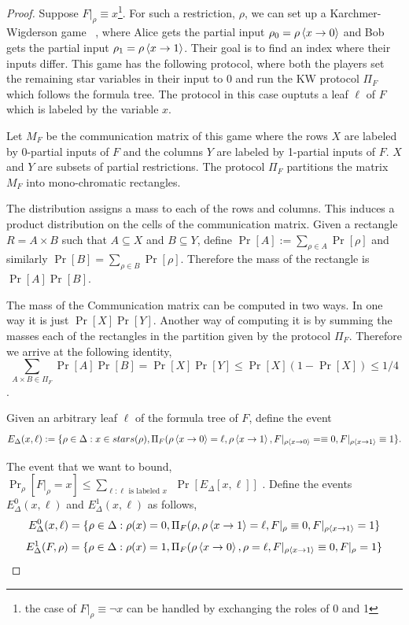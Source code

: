 \begin{proof}
    Suppose $F|_\rho \equiv x$\footnote{the case of $F|_\rho \equiv \neg x$ can be handled by exchanging the roles of 0 and 1}. For such a restriction, $\rho$, we can set up a Karchmer-Wigderson game ~\cite{karchmer1990monotone}, where Alice gets the partial input $\rho_0 = \rho \left\langle x \to 0 \right\rangle$ and Bob gets the partial input $\rho_1 = \rho \left\langle x \to 1 \right\rangle$. Their goal is to find an index where their inputs differ. This game has the following protocol,
    where both the players set the remaining star variables in their input to 0 and run the KW protocol $\Pi_F$ which follows the formula tree. The protocol in this case ouptuts a leaf $\ell$ of $F$ which is labeled by the variable $x$.   

    Let $M_F$ be the communication matrix of this game where the rows $X$ are labeled by 0-partial inputs of $F$ and the columns $Y$ are labeled by 1-partial inputs of $F$. $X$ and $Y$ are subsets of partial restrictions. The protocol $\Pi_F$ partitions the matrix $M_F$ into mono-chromatic rectangles. 

    The distribution assigns a mass to each of the rows and columns. This induces a product distribution on the cells of the communication matrix. 
    Given a rectangle $R = A \times B$ such that $A \subseteq X$ and $B \subseteq Y$, define $\Pr[A] := \sum_{\rho \in A} \Pr[\rho]$ and similarly $\Pr[B] = \sum_{\rho \in B} \Pr[\rho]$. Therefore the mass of the rectangle is $\Pr[A]\Pr[B]$. 

    The mass of the Communication matrix can be computed in two ways. In one way it is just $\Pr[X]\Pr[Y]$. 
    Another way of computing it is by summing the masses each of the rectangles in the partition given by the protocol $\Pi_F$. Therefore we arrive at the following identity,
    $$\sum_{A \times B \in \Pi_F} \Pr[A] \Pr [B] = \Pr[X] \Pr[Y] \leq \Pr[X](1- \Pr[X]) \leq 1/4$$.

    Given an arbitrary leaf $\ell$ of the formula tree of $F$, define the event 
    $$E_\Delta(x,\ell):= \{\rho \in \Delta: x \in stars(\rho), \Pi_F(\rho\left\langle x \to 0 \right\rangle = \ell,\rho\left\langle x \to 1 \right\rangle, F|_{\rho\left\langle x \to 0 \right\rangle}=\equiv  0, F|_{\rho\left\langle x \to 1 \right\rangle} \equiv 1 \}.$$

    The event that we want to bound, $\Pr_\rho[F|_\rho = x] \le \sum_{\ell: \ell \text{\ is\ labeled $x$\ }} \Pr[E_\Delta[x,\ell]]$ . 
    Define the events $E^0_\Delta(x,\ell)$ and $E^1_\Delta(x,\ell)$ as follows, 
    $$E^0_\Delta(x,\ell) = \{\rho \in \Delta: \rho(x) =0, \Pi_F(\rho, \rho\left\langle x \to 1 \right\rangle =\ell, F|_\rho \equiv 0, F|_{\rho\left\langle x \to 1 \right\rangle} = 1 \}$$
    $$E^1_\Delta(F,\rho) = \{\rho \in \Delta: \rho(x) =1, \Pi_F(\rho\left\langle x \to 0 \right\rangle, \rho =\ell, F|_{\rho\left\langle x \to 1 \right\rangle} \equiv 0, F|_{\rho} = 1 \}$$


\end{proof}
